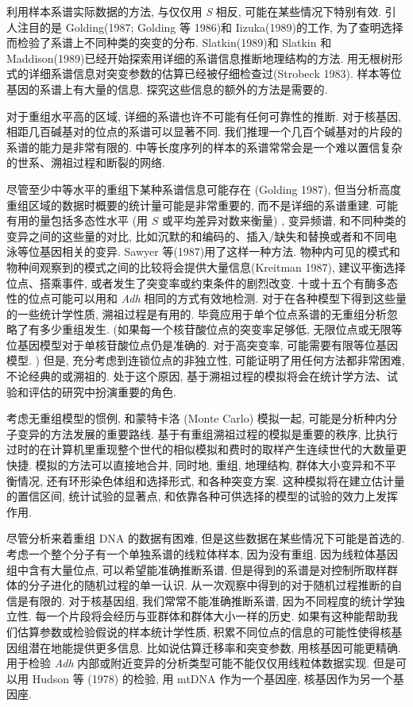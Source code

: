 \documentclass[
    12pt,%
    ]{article}
\begin{document}
利用样本系谱实际数据的方法, 与仅仅用 \textit{S} 相反, 可能在某些情况下特别有效. 引人注目的是 Golding(1987; Golding 等
1986)和 Iizuka(1989)的工作, 为了查明选择而检验了系谱上不同种类的突变的分布. Slatkin(1989)和 Slatkin 和
Maddison(1989)已经开始探索用详细的系谱信息推断地理结构的方法.
用无根树形式的详细系谱信息对突变参数的估算已经被仔细检查过(Strobeck 1983). 样本等位基因的系谱上有大量的信息.
探究这些信息的额外的方法是需要的.

对于重组水平高的区域, 详细的系谱也许不可能有任何可靠性的推断. 对于核基因, 相距几百碱基对的位点的系谱可以显著不同.
我们推理一个几百个碱基对的片段的系谱的能力是非常有限的.
中等长度序列的样本的系谱常常会是一个难以置信复杂的世系、溯祖过程和断裂的网络.

尽管至少中等水平的重组下某种系谱信息可能存在 (Golding 1987), 但当分析高度重组区域的数据时概要的统计量可能是非常重要的,
而不是详细的系谱重建. 可能有用的量包括多态性水平 (用 $S$ 或平均差异对数来衡量) , 变异频谱,
和不同种类的变异之间的这些量的对比, 比如沉默的和编码的、插入/缺失和替换或者和不同电泳等位基因相关的变异. Sawyer
等(1987)用了这样一种方法. 物种内可见的模式和物种间观察到的模式之间的比较将会提供大量信息(Kreitman 1987),
建议平衡选择位点、搭乘事件, 或者发生了突变率或约束条件的剧烈改变.
十或十五个有酶多态性的位点可能可以用和 \textit{Adh} 相同的方式有效地检测. 对于在各种模型下得到这些量的一些统计学性质,
溯祖过程是有用的. 毕竟应用于单个位点系谱的无重组分析忽略了有多少重组发生. (如果每一个核苷酸位点的突变率足够低,
无限位点或无限等位基因模型对于单核苷酸位点仍是准确的. 对于高突变率, 可能需要有限等位基因模型. ) 但是,
充分考虑到连锁位点的非独立性, 可能证明了用任何方法都非常困难, 不论经典的或溯祖的. 处于这个原因,
基于溯祖过程的模拟将会在统计学方法、试验和评估的研究中扮演重要的角色.

考虑无重组模型的惯例, 和蒙特卡洛 (Monte Carlo) 模拟一起, 可能是分析种内分子变异的方法发展的重要路线.
基于有重组溯祖过程的模拟是重要的秩序, 比执行过时的在计算机里重现整个世代的相似模拟和费时的取样产生连续世代的大数量更快捷.
模拟的方法可以直接地合并, 同时地, 重组, 地理结构, 群体大小变异和不平衡情况, 还有环形染色体组和选择形式, 和各种突变方案.
这种模拟将在建立估计量的置信区间, 统计试验的显著点, 和依靠各种可供选择的模型的试验的效力上发挥作用.

尽管分析来着重组 DNA 的数据有困难, 但是这些数据在某些情况下可能是首选的. 考虑一个整个分子有一个单独系谱的线粒体样本,
因为没有重组. 因为线粒体基因组中含有大量位点, 可以希望能准确推断系谱.
但是得到的系谱是对控制所取样群体的分子进化的随机过程的单一认识. 从一次观察中得到的对于随机过程推断的自信是有限的.
对于核基因组, 我们常常不能准确推断系谱, 因为不同程度的统计学独立性. 每一个片段将会经历与亚群体和群体大小一样的历史.
如果有这种能帮助我们估算参数或检验假说的样本统计学性质, 积累不同位点的信息的可能性使得核基因组潜在地能提供更多信息.
比如说估算迁移率和突变参数, 用核基因可能更精确.
用于检验 \textit{Adh} 内部或附近变异的分析类型可能不能仅仅用线粒体数据实现. 但是可以用 Hudson 等 (1978) 的检验, 用
mtDNA 作为一个基因座, 核基因作为另一个基因座.
\end{document}
